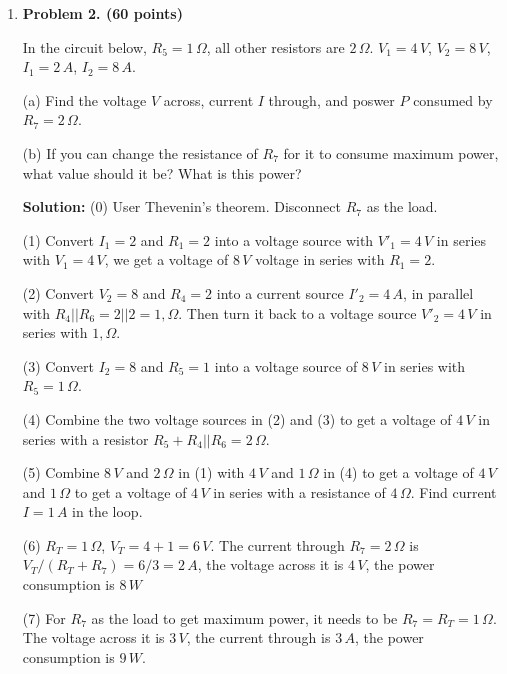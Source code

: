\begin{enumerate}
\item {\bf Problem 2. (60 points)} 
  
  In the circuit below, $R_5=1\,\Omega$, all other resistors are
  $2\,\Omega$. $V_1=4\,V$, $V_2=8\,V$, $I_1=2\,A$, $I_2=8\,A$.

  (a) Find the voltage $V$ across, current $I$ through, and poswer
  $P$ consumed by $R_7=2\,\Omega$.
  

  (b) If you can change the resistance of $R_7$ for it to consume
  maximum power, what value should it be? What is this power?


  {\bf Solution:} 
  (0) User Thevenin's theorem. Disconnect $R_7$ as the load.

  (1) Convert $I_1=2$ and $R_1=2$ into a voltage source with $V'_1=4\,V$
  in series with $V_1=4\,V$, we get a voltage of $8\,V$ voltage in series 
  with $R_1=2$. 
  
  (2) Convert $V_2=8$ and $R_4=2$ into a current source $I'_2=4\,A$, in 
  parallel with $R_4||R_6=2||2=1,\Omega$. Then turn it back to a voltage 
  source $V'_2=4\,V$ in series with $1,\Omega$. 

  (3) Convert $I_2=8$ and $R_5=1$ into a voltage source of $8\,V$ in series
  with $R_5=1\,\Omega$.

  (4) Combine the two voltage sources in (2) and (3) to get a voltage of 
  $4\,V$ in series with a resistor $R_5+R_4||R_6=2\,\Omega$.

  (5) Combine $8\,V$ and $2\,\Omega$ in (1) with $4\,V$ and $1\,\Omega$ 
  in (4) to get a voltage of $4\,V$ and $1\,\Omega$ to get a voltage of 
  $4\,V$ in series with a resistance of $4\,\Omega$. Find current $I=1\,A$
  in the loop.

  (6) $R_T=1\,\Omega$, $V_T=4+1=6\,V$. The current through $R_7=2\,\Omega$
  is $V_T/(R_T+R_7)=6/3=2\,A$, the voltage across it is $4\,V$, the power
  consumption is $8\,W$

  (7) For $R_7$ as the load to get maximum power, it needs to be 
  $R_7=R_T=1\,\Omega$. The voltage across it is $3\,V$, the current 
  through is $3\,A$, the power consumption is $9\,W$.


\end{enumerate}

